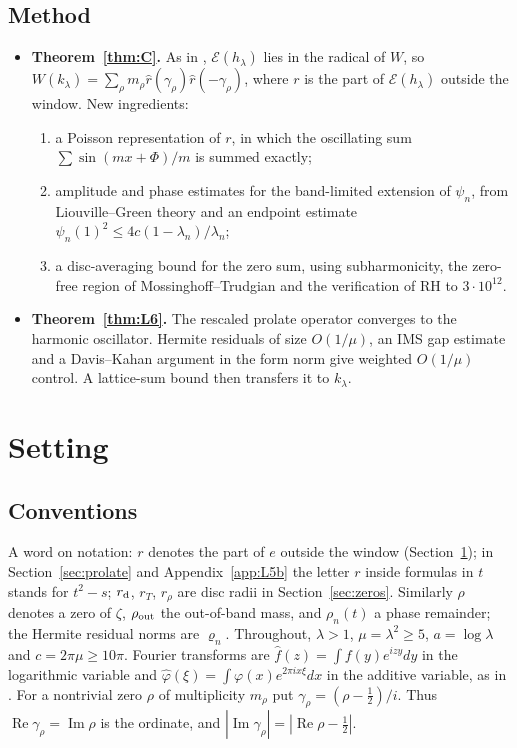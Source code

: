\documentclass[11pt]{amsart}
\theoremstyle{remark}
\numberwithin{equation}{section}
\newcommand{\E}{\mathcal{E}}
\begin{document}
\subsection{Method}
\begin{itemize}
\item \textbf{Theorem~\ref{thm:C}.} As in \cite{MoriWWUB}, $\E(h_\lambda)$ lies in the radical of $W$, so $W(k_\lambda)=\sum_\rho m_\rho\hat r(\gamma_\rho)\hat r(-\gamma_\rho)$, where $r$ is the part of $\E(h_\lambda)$ outside the window. New ingredients:
  \begin{enumerate}
  \item a Poisson representation of $r$, in which the oscillating sum $\sum\sin(mx+\Phi)/m$ is summed exactly;
  \item amplitude and phase estimates for the band-limited extension of $\psi_n$, from Liouville--Green theory and an endpoint estimate $\psi_n(1)^2\le4c(1-\lambda_n)/\lambda_n$;
  \item a disc-averaging bound for the zero sum, using subharmonicity, the zero-free region of Mossinghoff--Trudgian and the verification of RH to $3\cdot10^{12}$.
  \end{enumerate}
\item \textbf{Theorem~\ref{thm:L6}.} The rescaled prolate operator converges to the harmonic oscillator. Hermite residuals of size $O(1/\mu)$, an IMS gap estimate and a Davis--Kahan argument in the form norm give weighted $O(1/\mu)$ control. A lattice-sum bound then transfers it to $k_\lambda$.
\end{itemize}

\section{Setting}\label{sec:setting}

\subsection{Conventions}
A word on notation: $r$ denotes the part of $e$ outside the window (Section~\ref{sec:setting}); in Section~\ref{sec:prolate} and Appendix~\ref{app:L5b} the letter $r$ inside formulas in $t$ stands for $t^2-s$; $r_{\rm d}$, $r_T$, $r_\rho$ are disc radii in Section~\ref{sec:zeros}. Similarly $\rho$ denotes a zero of $\zeta$, $\rho_{\rm out}$ the out-of-band mass, and $\rho_n(t)$ a phase remainder; the Hermite residual norms are $\varrho_n$.
Throughout, $\lambda>1$, $\mu=\lambda^2\ge5$, $a=\log\lambda$ and $c=2\pi\mu\ge10\pi$. Fourier transforms are $\hat f(z)=\int f(y)e^{izy}dy$ in the logarithmic variable and $\hat\varphi(\xi)=\int\varphi(x)e^{2\pi ix\xi}dx$ in the additive variable, as in \cite{MoriWWUB}. For a nontrivial zero $\rho$ of multiplicity $m_\rho$ put $\gamma_\rho=(\rho-\frac12)/i$. Thus $\operatorname{Re}\gamma_\rho=\operatorname{Im}\rho$ is the ordinate, and $|\operatorname{Im}\gamma_\rho|=|\operatorname{Re}\rho-\frac12|$.
\end{document}

